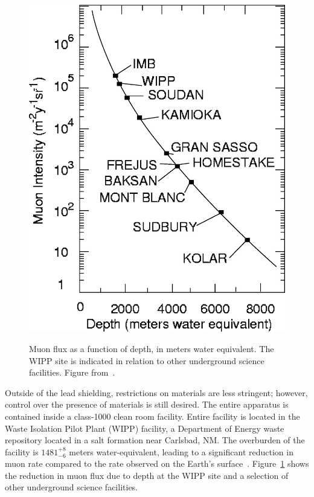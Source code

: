 \begin{figure}
\begin{center}
\includegraphics[keepaspectratio=true,width=\textwidth]{muonflux.eps}
\end{center}
\renewcommand{\baselinestretch}{1}
\small\normalsize
\begin{quote}
\caption{Muon flux as a function of depth, in meters water equivalent.  The WIPP site is indicated in relation to other underground science facilities.  Figure from~\cite{Esch2005516}.}
\label{fig:MuonFluxVsDepth}
\end{quote}
\end{figure}
\renewcommand{\baselinestretch}{2}
\small\normalsize

Outside of the lead shielding, restrictions on materials are less stringent; however, control over the presence of materials is still desired.  The entire apparatus is contained inside a class-1000 clean room facility.  Entire facility is located in the Waste Isolation Pilot Plant (WIPP) facility, a Department of Energy waste repository located in a salt formation near Carlsbad, NM.  The overburden of the facility is $1481^{+8}_{-6}$ meters water-equivalent, leading to a significant reduction in muon rate compared to the rate observed on the Earth's surface~\cite{ThesisSteve}.  Figure~\ref{fig:MuonFluxVsDepth} shows the reduction in muon flux due to depth at the WIPP site and a selection of other underground science facilities.

